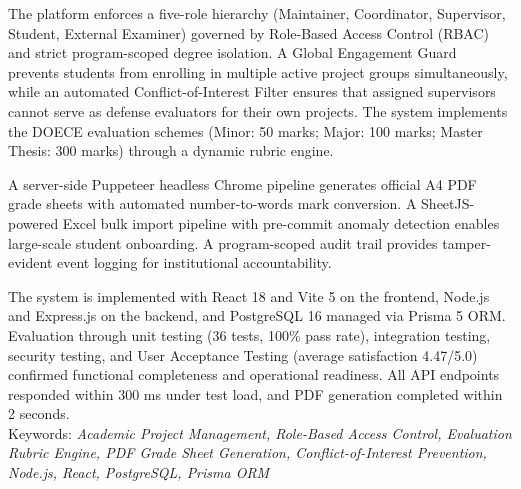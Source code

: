\documentclass[12pt]{report}
\begin{document}
The platform enforces a five-role hierarchy (Maintainer, Coordinator, Supervisor, Student, External Examiner) governed by Role-Based Access Control (RBAC) and strict program-scoped degree isolation. A Global Engagement Guard prevents students from enrolling in multiple active project groups simultaneously, while an automated Conflict-of-Interest Filter ensures that assigned supervisors cannot serve as defense evaluators for their own projects. The system implements the DOECE evaluation schemes (Minor: 50 marks; Major: 100 marks; Master Thesis: 300 marks) through a dynamic rubric engine.

A server-side Puppeteer headless Chrome pipeline generates official A4 PDF grade sheets with automated number-to-words mark conversion. A SheetJS-powered Excel bulk import pipeline with pre-commit anomaly detection enables large-scale student onboarding. A program-scoped audit trail provides tamper-evident event logging for institutional accountability.

The system is implemented with React 18 and Vite 5 on the frontend, Node.js and Express.js on the backend, and PostgreSQL 16 managed via Prisma 5 ORM. Evaluation through unit testing (36 tests, 100\% pass rate), integration testing, security testing, and User Acceptance Testing (average satisfaction 4.47/5.0) confirmed functional completeness and operational readiness. All API endpoints responded within 300 ms under test load, and PDF generation completed within 2 seconds.\\
\newline
Keywords: \textit{Academic Project Management, Role-Based Access Control, Evaluation Rubric Engine, PDF Grade Sheet Generation, Conflict-of-Interest Prevention, Node.js, React, PostgreSQL, Prisma ORM}

\tableofcontents
{}
\listoffigures
{}
\listoftables
{}

\end{document}
